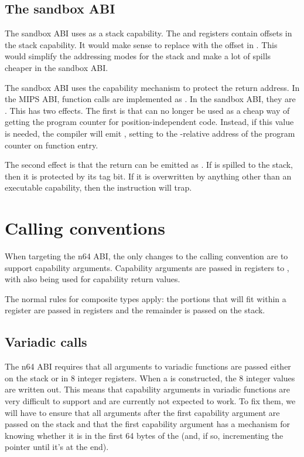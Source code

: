 \subsection{The sandbox ABI}

The sandbox ABI uses  as a stack capability.
The  and  registers contain offsets in the stack capability.
It would make sense to replace  with the offset in .
This would simplify the addressing modes for the stack and make a lot of spills cheaper in the sandbox ABI.

The sandbox ABI uses the capability mechanism to protect the return address.
In the MIPS ABI, function calls are implemented as .
In the sandbox ABI, they are .
This has two effects.
The first is that  can no longer be used as a cheap way of getting the program counter for position-independent code.
Instead, if this value is needed, the compiler will emit , setting  to the -relative address of the program counter on function entry.

The second effect is that the return can be emitted as .
If  is spilled to the stack, then it is protected by its tag bit.
If it is overwritten by anything other than an executable capability, then the  instruction will trap.

\section{Calling conventions}

When targeting the n64 ABI, the only changes to the calling convention are to support capability arguments.
Capability arguments are passed in registers  to , with  also being used for capability return values.

The normal rules for composite types apply: the portions that will fit within a register are passed in registers and the remainder is passed on the stack.

\subsection{Variadic calls}

The n64 ABI requires that all arguments to variadic functions are passed either on the stack or in 8 integer registers.
When a  is constructed, the 8 integer values are written out.
This means that capability arguments in variadic functions are very difficult to support and are currently not expected to work.
To fix them, we will have to ensure that all arguments after the first capability argument are passed on the stack and that the first capability argument has a mechanism for knowing whether it is in the first 64 bytes of the  (and, if so, incrementing the pointer until it's at the end).

